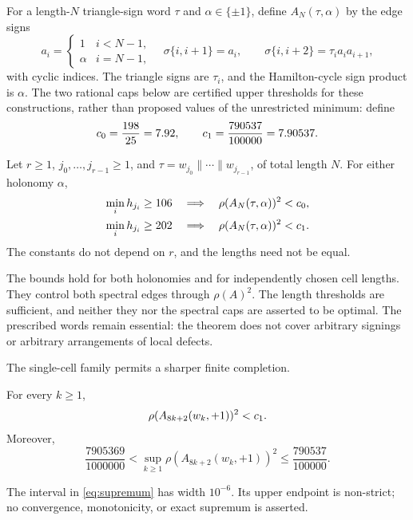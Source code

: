 For a length-$N$ triangle-sign word
$\tau$ and $\alpha\in\{\pm1\}$, define $A_N(\tau,\alpha)$ by the edge signs
\begin{equation}
 a_i=\begin{cases}1&i<N-1,\\\alpha&i=N-1,\end{cases}
 \quad
 \sigma\{i,i+1\}=a_i,\qquad
 \sigma\{i,i+2\}=\tau_i a_i a_{i+1},
 \label{eq:gauge-definition}
\end{equation}
with cyclic indices. The triangle signs are $\tau_i$, and the
Hamilton-cycle sign product is $\alpha$.
The two rational caps below are certified upper thresholds for these
constructions, rather than proposed values of the unrestricted minimum:
define
\[
 c_0=\frac{198}{25}=7.92,\qquad
 c_1=\frac{790537}{100000}=7.90537.
\]

\begin{theorem}\label{thm:cells}
Let $r\ge1$, $j_0,\ldots,j_{r-1}\ge1$, and
$\tau=w_{j_0}\|\cdots\|w_{j_{r-1}}$, of total length $N$.
For either holonomy $\alpha$,
\begin{align}
 \min_i h_{j_i}\ge106&\quad\Longrightarrow\quad
       \rho(A_N(\tau,\alpha))^2<c_0,\label{eq:cell-cap0}\\
 \min_i h_{j_i}\ge202&\quad\Longrightarrow\quad
       \rho(A_N(\tau,\alpha))^2<c_1.\label{eq:cell-cap1}
\end{align}
The constants do not depend on $r$, and the lengths need not be equal.
\end{theorem}

The bounds hold for both holonomies and for independently chosen cell
lengths. They control both spectral edges through $\rho(A)^2$.
The length thresholds are sufficient, and neither they nor the spectral
caps are asserted to be optimal. The prescribed words remain essential:
the theorem does not cover arbitrary signings or arbitrary arrangements
of local defects.

The single-cell family permits a sharper finite completion.
\begin{theorem}\label{thm:one-cell}
For every $k\ge1$,
\[
 \rho(A_{8k+2}(w_k,+1))^2<c_1.
\]
Moreover,
\begin{equation}
 \frac{7905369}{1000000}
 <\sup_{k\ge1}\rho(A_{8k+2}(w_k,+1))^2
 \le\frac{790537}{100000}.
 \label{eq:supremum}
\end{equation}
\end{theorem}
The interval in \eqref{eq:supremum} has width $10^{-6}$. Its upper endpoint
is non-strict; no convergence, monotonicity, or exact supremum is asserted.

